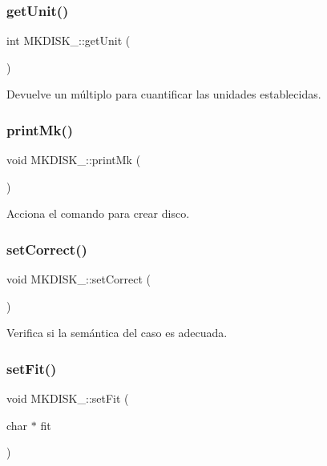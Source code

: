 \subsubsection{\texorpdfstring{get\+Unit()}{getUnit()}}
{\footnotesize\ttfamily int M\+K\+D\+I\+S\+K\+\_\+\+::get\+Unit (\begin{DoxyParamCaption}{ }\end{DoxyParamCaption})}

Devuelve un múltiplo para cuantificar las unidades establecidas. \mbox{\label{classMKDISK___a0589ffca3e13a4175510e2c6a60f2108}} 
\subsubsection{\texorpdfstring{print\+Mk()}{printMk()}}
{\footnotesize\ttfamily void M\+K\+D\+I\+S\+K\+\_\+\+::print\+Mk (\begin{DoxyParamCaption}{ }\end{DoxyParamCaption})}

Acciona el comando para crear disco. \mbox{\label{classMKDISK___a9bcda3d3c6b9e0b6e42ff23538993378}} 
\subsubsection{\texorpdfstring{set\+Correct()}{setCorrect()}}
{\footnotesize\ttfamily void M\+K\+D\+I\+S\+K\+\_\+\+::set\+Correct (\begin{DoxyParamCaption}{ }\end{DoxyParamCaption})}

Verifica si la semántica del caso es adecuada. \mbox{\label{classMKDISK___a12001e69efc0110fafe2a5190d06a47d}} 
\subsubsection{\texorpdfstring{set\+Fit()}{setFit()}}
{\footnotesize\ttfamily void M\+K\+D\+I\+S\+K\+\_\+\+::set\+Fit (\begin{DoxyParamCaption}\item[{char $\ast$}]{fit }\end{DoxyParamCaption})}


